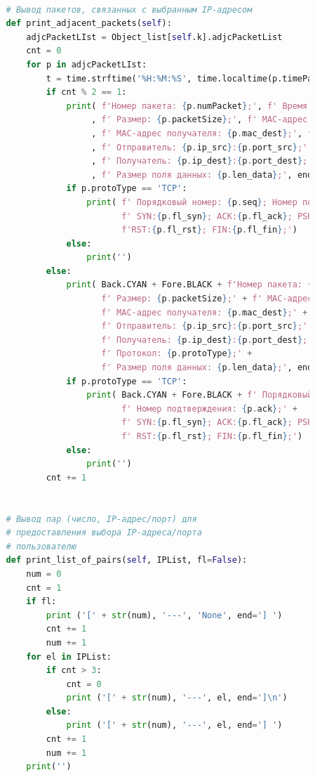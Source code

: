 \documentclass[bachelor, och, coursework]{SCWorks}
\begin{document}
\begin{lstlisting}[language=Python]
      
          # Вывод пакетов, связанных с выбранным IP-адресом 
          def print_adjacent_packets(self):
              adjcPacketLIst = Object_list[self.k].adjcPacketList
              cnt = 0
              for p in adjcPacketLIst:
                  t = time.strftime('%H:%M:%S', time.localtime(p.timePacket))
                  if cnt % 2 == 1:
                      print( f'Номер пакета: {p.numPacket};', f' Время: {t};'
                           , f' Размер: {p.packetSize};', f' MAC-адрес отправителя: {p.mac_src};'
                           , f' MAC-адрес получателя: {p.mac_dest};', f' Протокол: {p.protoType};'
                           , f' Отправитель: {p.ip_src}:{p.port_src};'
                           , f' Получатель: {p.ip_dest}:{p.port_dest};'
                           , f' Размер поля данных: {p.len_data};', end='' )
                      if p.protoType == 'TCP':
                          print( f' Порядковый номер: {p.seq}; Номер подтверждения: {p.ack};' +
                                 f' SYN:{p.fl_syn}; ACK:{p.fl_ack}; PSH:{p.fl_psh}; ' +
                                 f'RST:{p.fl_rst}; FIN:{p.fl_fin};')
                      else:
                          print('')
                  else:
                      print( Back.CYAN + Fore.BLACK + f'Номер пакета: {p.numPacket};' + f' Время: {t};' +
                             f' Размер: {p.packetSize};' + f' MAC-адрес отправителя: {p.mac_src};' +
                             f' MAC-адрес получателя: {p.mac_dest};' + 
                             f' Отправитель: {p.ip_src}:{p.port_src};' +
                             f' Получатель: {p.ip_dest}:{p.port_dest};' +
                             f' Протокол: {p.protoType};' +
                             f' Размер поля данных: {p.len_data};', end='' )
                      if p.protoType == 'TCP':
                          print( Back.CYAN + Fore.BLACK + f' Порядковый номер: {p.seq};' +
                                 f' Номер подтверждения: {p.ack};' +
                                 f' SYN:{p.fl_syn}; ACK:{p.fl_ack}; PSH:{p.fl_psh};' +
                                 f' RST:{p.fl_rst}; FIN:{p.fl_fin};')
                      else:
                          print('')
                  cnt += 1
      
      
          # Вывод пар (число, IP-адрес/порт) для
          # предоставления выбора IP-адреса/порта
          # пользователю
          def print_list_of_pairs(self, IPList, fl=False):
              num = 0
              cnt = 1
              if fl:
                  print ('[' + str(num), '---', 'None', end='] ')
                  cnt += 1
                  num += 1
              for el in IPList:
                  if cnt > 3:
                      cnt = 0
                      print ('[' + str(num), '---', el, end=']\n')
                  else:
                      print ('[' + str(num), '---', el, end='] ')
                  cnt += 1
                  num += 1
              print('')
      

\end{lstlisting}
\end{document}
